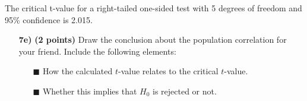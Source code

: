 The critical t-value for a right-tailed one-sided test with 5 degrees of freedom and 95\% confidence is 2.015.

\begin{itemize}

    \item[\textbf{7e)}] \textbf{(2 points)} Draw the conclusion about the population correlation for your friend. Include the following elements:
    \begin{itemize}
        \item[$\blacksquare$] How the calculated $t$-value relates to the critical $t$-value.
        \item[$\blacksquare$] Whether this implies that $H_0$ is rejected or not.
    \end{itemize}
    
\end{itemize}


\clearpage %